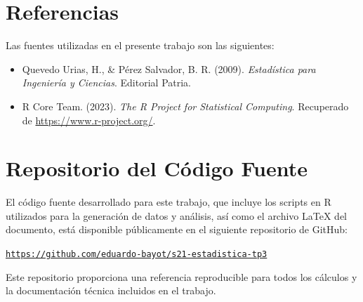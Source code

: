 \documentclass[a4paper,12pt]{article}
\begin{document}
\section{Referencias}

Las fuentes utilizadas en el presente trabajo son las siguientes:

\begin{itemize}
    \item Quevedo Urias, H., \& Pérez Salvador, B. R. (2009). \textit{Estadística para Ingeniería y Ciencias}. Editorial Patria.
    \item R Core Team. (2023). \textit{The R Project for Statistical Computing}. Recuperado de \url{https://www.r-project.org/}.
\end{itemize}

\printbibliography

\appendix
\section{Repositorio del Código Fuente}

El código fuente desarrollado para este trabajo, que incluye los scripts en R utilizados para la generación de datos y análisis, así como el archivo LaTeX del documento, está disponible públicamente en el siguiente repositorio de GitHub:

\noindent\href{https://github.com/eduardo-bayot/s21-estadistica-tp3}{\texttt{https://github.com/eduardo-bayot/s21-estadistica-tp3}}

Este repositorio proporciona una referencia reproducible para todos los cálculos y la documentación técnica incluidos en el trabajo.
\end{document}
